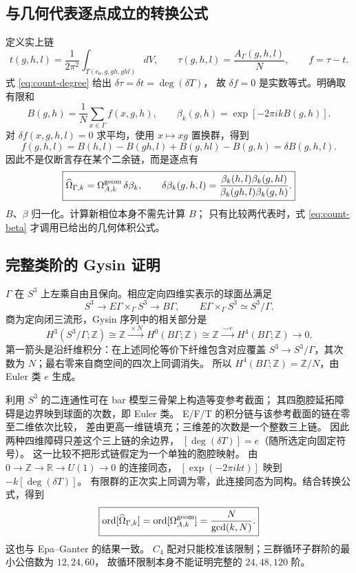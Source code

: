 \subsection{与几何代表逐点成立的转换公式}
定义实上链
\[
t(g,h,l)=\frac1{2\pi^2}\int_{T(e_0,g,gh,ghl)}dV,
\qquad \tau(g,h,l)=\frac{A_\Gamma(g,h,l)}N,
\qquad f=\tau-t.
\]
式 \eqref{eq:count-degree} 给出 $\delta\tau=\delta t=\deg(\delta T)$，
故 $\delta f=0$ 是实数等式。明确取有限和
\begin{equation}
B(g,h)=\frac1N\sum_{x\in\Gamma}f(x,g,h),
\qquad \beta_k(g,h)=\exp[-2\pi i kB(g,h)].
\label{eq:count-beta}
\end{equation}
对 $\delta f(x,g,h,l)=0$ 求平均，使用 $x\mapsto xg$ 置换群，得到
\[
f(g,h,l)=B(h,l)-B(gh,l)+B(g,hl)-B(g,h)=\delta B(g,h,l).
\]
因此不是仅断言存在某个二余链，而是逐点有
\begin{equation}
\boxed{\widehat\omega_{\Gamma,k}=\omega^{\rm geom}_{A,k}\,\delta\beta_k,
\qquad \delta\beta_k(g,h,l)=
\frac{\beta_k(h,l)\beta_k(g,hl)}{\beta_k(gh,l)\beta_k(g,h)}.}
\label{eq:count-conversion}
\end{equation}
$B$、$\beta$ 归一化。计算新相位本身不需先计算 $B$；
只有比较两代表时，式 \eqref{eq:count-beta} 才调用已给出的几何体积公式。

\subsection{完整类阶的 Gysin 证明}
$\Gamma$ 在 $S^3$ 上左乘自由且保向。相应定向四维实表示的球面丛满足
\[
S^3\longrightarrow E\Gamma\times_\Gamma S^3\longrightarrow B\Gamma,
\qquad E\Gamma\times_\Gamma S^3\simeq S^3/\Gamma.
\]
商为定向闭三流形，Gysin 序列中的相关部分是
\[
H^3(S^3/\Gamma;\mathbb Z)\cong\mathbb Z
\xrightarrow{\ \times N\ }H^0(B\Gamma;\mathbb Z)\cong\mathbb Z
\xrightarrow{\ \smile e\ }H^4(B\Gamma;\mathbb Z)\longrightarrow0.
\]
第一箭头是沿纤维积分：在上述同伦等价下纤维包含对应覆盖
$S^3\to S^3/\Gamma$，其次数为 $N$；最右零来自商空间的四次上同调消失。
所以 $H^4(B\Gamma;\mathbb Z)=\mathbb Z/N$，由 Euler 类 $e$ 生成。

利用 $S^3$ 的二连通性可在 bar 模型三骨架上构造等变参考截面；
其四胞腔延拓障碍是边界映到球面的次数，即 Euler 类。
E/F/T 的积分链与该参考截面的链在零至二维依次比较，
差由更高一维链填充；三维差的次数是一个整数三上链。
因此两种四维障碍只差这个三上链的余边界，
$[\deg(\delta T)]=e$（随所选定向固定符号）。
这一比较不把形式链假定为一个单独的胞腔映射。
由 $0\to\mathbb Z\to\mathbb R\to U(1)\to0$ 的连接同态，
$[\exp(-2\pi ikt)]$ 映到 $-k[\deg(\delta T)]$。
有限群的正次实上同调为零，此连接同态为同构。结合转换公式，得到
\begin{equation}
\boxed{\operatorname{ord}[\widehat\omega_{\Gamma,k}]
=\operatorname{ord}[\omega^{\rm geom}_{A,k}]
=\frac{N}{\gcd(k,N)}.}\label{eq:count-order}
\end{equation}
这也与 Epa--Ganter 的结果一致\cite{epa}。
$C_4$ 配对只能校准该限制；三群循环子群阶的最小公倍数为 $12,24,60$，
故循环限制本身不能证明完整的 $24,48,120$ 阶。


